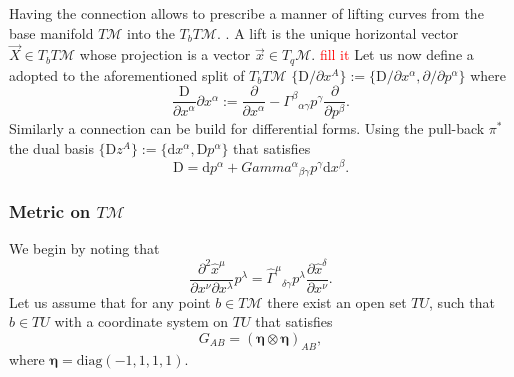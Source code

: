 %
Having the connection allows to prescribe a manner of lifting curves from the base manifold $T\mathcal{M}$ 
into the $T_b T\mathcal{M}$.
. 
A lift is the unique horizontal vector $\vec{X}\in T_bT\mathcal{M}$ 
whose projection is a vector $\vec{x}\in T_q\mathcal{M}$.
\textcolor{red}{fill it}
%
Let us now define a  adopted to the aforementioned 
split of $T_b T\mathcal{M}$ $\{\text{D}/\partial x^A \}:=\{\text{D}/\partial x^{\alpha}, \partial/\partial p^{\alpha} \}$ where 
%
%
\begin{equation}
\frac{\text{D}}{\partial x^{\alpha}}{\partial x^{\alpha}} := \frac{\partial}{\partial x^{\alpha}} - {\Gamma^{\beta}}_{\alpha\gamma}p^{\gamma}\frac{\partial}{\partial p^{\beta}}.
\end{equation}
%
Similarly a connection can be build for differential forms. 
Using the pull-back $\pi^*$ the dual basis 
$\{ \text{D}z^{A} \}:=\{\text{d}x^{\alpha}, \text{D}p^{\alpha}\}$ that satisfies 
%
\begin{equation}
\text{D} = \text{d} p ^{\alpha} + {Gamma^{\alpha}}_{\beta\gamma}p^{\gamma}\text{d}x^{\beta}.
\end{equation}



\subsubsection{Metric on $T\mathcal{M}$}
%
We begin by noting that 
%
\begin{equation}
\frac{\partial^2 \hat{x}^{\mu}}{\partial x^{\nu}\partial x^{\lambda}}p^{\lambda} = {\hat{\Gamma}^{\mu}}_{\delta\gamma}p^{\lambda}\frac{\partial\hat{x}^{\delta}}{\partial x^{\nu}}.
\end{equation}
%
Let us assume that for any point $b\in T\mathcal{M}$ there exist an open set $TU$, 
such that $b\in TU$ with a coordinate system on $TU$ that satisfies
%
\begin{equation}
G_{AB} = (\boldsymbol{\eta}\otimes\boldsymbol{\eta})_{AB},
\end{equation}
%
where $\boldsymbol{\eta} = \text{diag}(-1, 1, 1, 1)$. 


